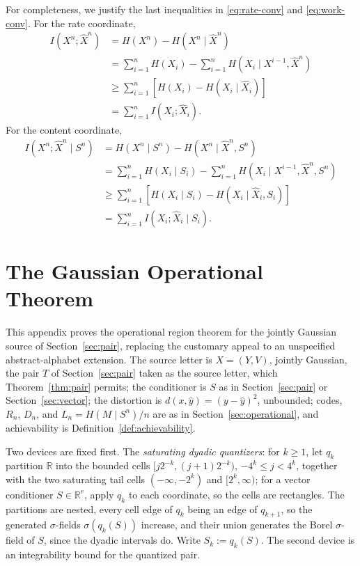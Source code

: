﻿\documentclass[11pt,onecolumn]{IEEEtran}
\newcommand{\R}{\mathbb{R}}
\newcommand{\hX}{\widehat{X}}
\newcommand{\hXn}{\widehat{X}^{n}}
\begin{document}
For completeness, we justify the last inequalities in
\eqref{eq:rate-conv} and \eqref{eq:work-conv}. For the rate coordinate,
\begin{align}
 I(X^n;\hXn)
 &=H(X^n)-H(X^n\mid\hXn)\nonumber\\
 &=\sum_{i=1}^{n}H(X_i)
   -\sum_{i=1}^{n}H(X_i\mid X^{i-1},\hXn)\nonumber\\
 &\ge\sum_{i=1}^{n}\left[H(X_i)-H(X_i\mid\hX_i)\right]\nonumber\\
 &=\sum_{i=1}^{n}I(X_i;\hX_i).
\end{align}
For the content coordinate,
\begin{align}
 I(X^n;\hXn\mid S^n)
 &=H(X^n\mid S^n)-H(X^n\mid\hXn,S^n)\nonumber\\
 &=\sum_{i=1}^{n}H(X_i\mid S_i)
   -\sum_{i=1}^{n}H(X_i\mid X^{i-1},\hXn,S^n)\nonumber\\
 &\ge\sum_{i=1}^{n}
 \left[H(X_i\mid S_i)-H(X_i\mid\hX_i,S_i)\right]\nonumber\\
 &=\sum_{i=1}^{n}I(X_i;\hX_i\mid S_i).
\end{align}

\section{The Gaussian Operational Theorem}
\label{app:gaussian}

This appendix proves the operational region theorem for the jointly
Gaussian source of Section~\ref{sec:pair}, replacing the customary
appeal to an unspecified abstract-alphabet extension. The source letter
is $X=(Y,V)$, jointly Gaussian, the pair $T$ of Section~\ref{sec:pair}
taken as the source letter, which Theorem~\ref{thm:pair} permits; the
conditioner is $S$ as in
Section~\ref{sec:pair} or Section~\ref{sec:vector}; the distortion is
$d(x,\hat y)=(y-\hat y)^2$, unbounded; codes, $R_n$, $D_n$, and
$L_n=H(M\mid S^n)/n$ are as in Section~\ref{sec:operational}, and
achievability is Definition~\ref{def:achievability}.

Two devices are fixed first. The \emph{saturating dyadic quantizers}:
for $k\ge1$, let $q_k$ partition $\R$ into the bounded cells
$[j2^{-k},(j+1)2^{-k})$, $-4^k\le j<4^k$, together with the two
saturating tail cells $(-\infty,-2^k)$ and $[2^k,\infty)$; for a vector
conditioner $S\in\R^r$, apply $q_k$ to each coordinate, so the cells
are rectangles. The partitions are nested, every cell edge of $q_k$
being an edge of $q_{k+1}$, so the generated $\sigma$-fields
$\sigma(q_k(S))$ increase, and their union generates the Borel
$\sigma$-field of $S$, since the dyadic intervals do. Write
$S_k:=q_k(S)$. The second device is an integrability bound for the
quantized pair.
\end{document}
